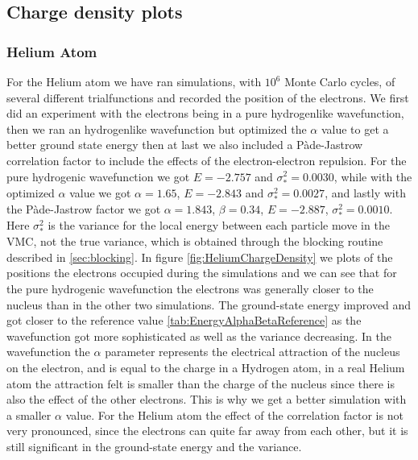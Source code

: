 \subsection{Charge density plots}

	\subsubsection{Helium Atom}
		For the Helium atom we have ran simulations, with \(10^6\) Monte Carlo cycles, of several different trialfunctions and recorded the position of the electrons. We first did an experiment with the electrons being in a pure hydrogenlike wavefunction, then we ran an hydrogenlike wavefunction but optimized the \(\alpha \) value to get a better ground state energy then at last we also included a Pàde-Jastrow correlation factor to include the effects of the electron-electron repulsion. For the pure hydrogenic wavefunction we got $E = -2.757$ and $\sigma^2_* = 0.0030$, while with the optimized \(\alpha\) value we got $\alpha = 1.65$, $E = -2.843$ and $\sigma^2_* = 0.0027$, and lastly with the Pàde-Jastrow factor we got $\alpha = 1.843$, $\beta = 0.34$, $E = -2.887$, $\sigma^2_* = 0.0010$. Here $\sigma^2_*$ is the variance for the local energy between each particle move in the VMC, not the true variance, which is obtained through the blocking routine described in \cref{sec:blocking}. In figure \ref{fig:HeliumChargeDensity} we plots of the positions the electrons occupied during the simulations and we can see that for the pure hydrogenic wavefunction the electrons was generally closer to the nucleus than in the other two simulations. The ground-state energy improved and got closer to the reference value \cref{tab:EnergyAlphaBetaReference} as the wavefunction got more sophisticated as well as the variance decreasing. In the wavefunction the $\alpha$ parameter represents the electrical attraction of the nucleus on the electron, and is equal to the charge in a Hydrogen atom, in a real Helium atom the attraction felt is smaller than the charge of the nucleus since there is also the effect of the other electrons. This is why we get a better simulation with a smaller \(\alpha\) value. For the Helium atom the effect of the correlation factor is not very pronounced, since the electrons can quite far away from each other, but it is still significant in the ground-state energy and the variance.
